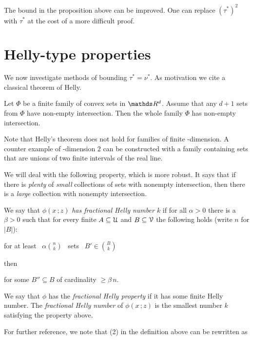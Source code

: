 \documentclass[scombinatorics.tex]{subfiles}
\begin{document}
The bound in the proposition above can be improved.
One can replace $(\tau^*)^2$ with  $\tau^*$ at the cost of a more difficult proof.

\section{Helly-type properties}

We now investigate methods of bounding $\tau^*=\nu^*$.
As motivation we cite a classical theorem of Helly.

\begin{proposition}
Let $\Phi$ be a finite family of convex sets in $\RR^d$.
Assume that any $d+1$ sets from $\Phi$ have non-empty intersection.
Then the whole family $\Phi$ has non-empty intersection.\QED
\end{proposition}

Note that Helly's theorem does not hold for families of finite \vc-dimension.
A counter example of \vc-dimension $2$ can be constructed with a family containing sets that are unions of two finite intervals of the real line.

We will deal with the following property, which is more robust. It says that if there is \textit{plenty\/} of \textit{small\/} collections of sets with nonempty intersection, then there is a \textit{large\/} collection with nonempty intersection.

\begin{definition}
We say that $\phi(x\,;z)$ \emph{has fractional Helly number $k$\/} if for all $\alpha>0$ there is a $\beta>0$ such that  for every finite $A\subseteq\EuScript U$ and $B\subseteq\EuScript V$ the following holds (write $n$ for $|B|$):

\hfill for at least \ $\displaystyle\alpha{n\choose k}$ \ sets \ $\displaystyle B'\in{B\choose k}$

then

\hfill for some $B''\subseteq B$ of cardinality $\ge\beta\,n$.

We say that $\phi$ has the \emph{fractional Helly property\/} if it has some finite Helly number.
The \emph{fractional Helly number\/} of $\phi(x\,;z)$ is the smallest number $k$ satisfying the property above.\QED
\end{definition}

For further reference, we note that (2) in the definition above can be rewritten as 
\end{document}

